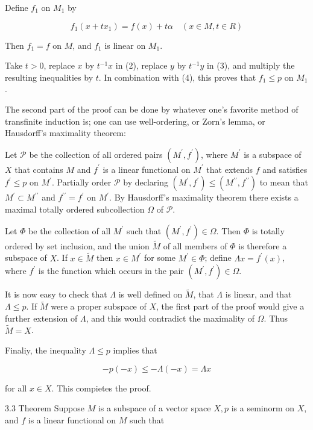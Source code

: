 \documentclass[10pt]{article}
\begin{document}
Define $f_{1}$ on $M_{1}$ by

$$
f_{1}\left(x+t x_{1}\right)=f(x)+t \alpha \quad(x \in M, t \in R)
$$

Then $f_{1}=f$ on $M$, and $f_{1}$ is linear on $M_{1}$.

Take $t>0$, replace $x$ by $t^{-1} x$ in (2), replace $y$ by $t^{-1} y$ in (3), and multiply the resulting inequalities by $t$. In combination with (4), this proves that $f_{1} \leq p$ on $M_{1}$.

The second part of the proof can be done by whatever one's favorite method of transfinite induction is; one can use well-ordering, or Zorn's lemma, or Hausdorff's maximality theorem:

Let $\mathscr{P}$ be the collection of all ordered pairs $\left(M^{\prime}, f^{\prime}\right)$, where $M^{\prime}$ is a subspace of $X$ that contains $M$ and $f^{\prime}$ is a linear functional on $M^{\prime}$ that extends $f$ and satisfies $f^{\prime} \leq p$ on $M^{\prime}$. Partially order $\mathscr{P}$ by declaring $\left(M^{\prime}, f^{\prime}\right) \leq\left(M^{\prime \prime}, f^{\prime \prime}\right)$ to mean that $M^{\prime} \subset M^{\prime \prime}$ and $f^{\prime \prime}=f^{\prime}$ on $M^{\prime}$. By Hausdorff's maximality theorem there exists a maximal totally ordered subcollection $\Omega$ of $\mathscr{P}$.

Let $\Phi$ be the collection of all $M^{\prime}$ such that $\left(M^{\prime}, f^{\prime}\right) \in \Omega$. Then $\Phi$ is totally ordered by set inclusion, and the union $\tilde{M}$ of all members of $\Phi$ is therefore a subspace of $X$. If $x \in \tilde{M}$ then $x \in M^{\prime}$ for some $M^{\prime} \in \Phi$; define $\Lambda x=f^{\prime}(x)$, where $f^{\prime}$ is the function which occurs in the pair $\left(M^{\prime}, f^{\prime}\right) \in \Omega$.

It is now easy to check that $\Lambda$ is well defined on $\tilde{M}$, that $\Lambda$ is linear, and that $\Lambda \leq p$. If $\tilde{M}$ were a proper subspace of $X$, the first part of the proof would give a further extension of $\Lambda$, and this would contradict the maximality of $\Omega$. Thus $\tilde{M}=X$.

Finaliy, the inequality $\Lambda \leq p$ implies that

$$
-p(-x) \leq-\Lambda(-x)=\Lambda x
$$

for all $x \in X$. This compietes the proof.

3.3 Theorem Suppose $M$ is a subspace of a vector space $X, p$ is a seminorm on $X$, and $f$ is a linear functional on $M$ such that
\end{document}

